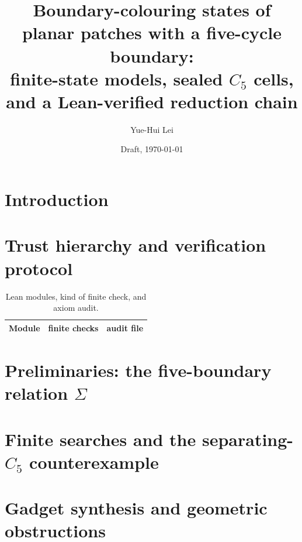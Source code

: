 \documentclass[11pt]{article}
\title{Boundary-colouring states of planar patches with a five-cycle boundary:\\
finite-state models, sealed $C_5$ cells, and a Lean-verified reduction chain}
\author{Yue-Hui Lei}
\date{Draft, \today}
\theoremstyle{definition}
\newcommand{\Sig}{\Sigma}
\begin{document}
\maketitle

\begin{abstract}
\end{abstract}

\section{Introduction}\label{sec:intro}

\section{Trust hierarchy and verification protocol}\label{sec:trust}
\begin{table}[h]\centering
\begin{tabular}{lll}\toprule
Module & finite checks & audit file \\ \midrule
\bottomrule\end{tabular}
\caption{Lean modules, kind of finite check, and axiom audit.}
\end{table}

\section{Preliminaries: the five-boundary relation \texorpdfstring{$\Sig$}{Sigma}}\label{sec:prelim}

\section{Finite searches and the separating-\texorpdfstring{$C_5$}{C5} counterexample}\label{sec:search}

\section{Gadget synthesis and geometric obstructions}\label{sec:gadgets}
\end{document}
